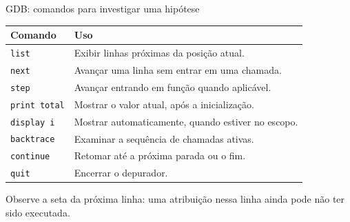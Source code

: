 \begin{frame}{GDB: comandos para investigar uma hipótese}
\small
\begin{tabularx}{\textwidth}{lX}
\toprule
Comando & Uso \\
\midrule
\texttt{list} & Exibir linhas próximas da posição atual. \\
\texttt{next} & Avançar uma linha sem entrar em uma chamada. \\
\texttt{step} & Avançar entrando em função quando aplicável. \\
\texttt{print total} & Mostrar o valor atual, após a inicialização. \\
\texttt{display i} & Mostrar automaticamente, quando estiver no escopo. \\
\texttt{backtrace} & Examinar a sequência de chamadas ativas. \\
\texttt{continue} & Retomar até a próxima parada ou o fim. \\
\texttt{quit} & Encerrar o depurador. \\
\bottomrule
\end{tabularx}
\small Observe a seta da próxima linha: uma atribuição nessa linha ainda pode não ter sido executada.
\end{frame}
